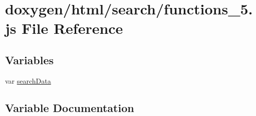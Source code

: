 \hypertarget{a00088}{}\section{doxygen/html/search/functions\+\_\+5.js File Reference}
\label{a00088}
\subsection*{Variables}
\begin{DoxyCompactItemize}
\item 
var \hyperlink{a00088_ad01a7523f103d6242ef9b0451861231e}{search\+Data}
\end{DoxyCompactItemize}


\subsection{Variable Documentation}
\hypertarget{a00088_ad01a7523f103d6242ef9b0451861231e}{}
